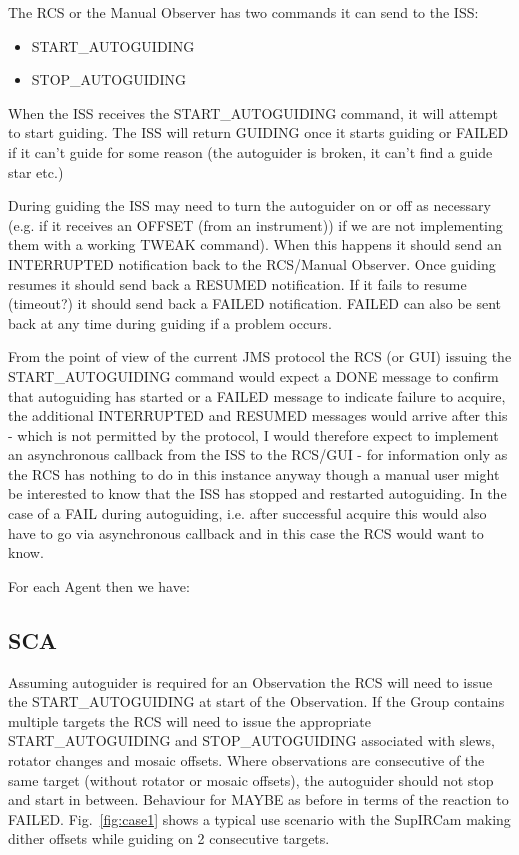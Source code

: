 \documentclass{article}
\begin{document}
The RCS or the Manual Observer has two commands
it can send to the ISS:

\begin{itemize}
\item START\_AUTOGUIDING
\item STOP\_AUTOGUIDING
\end{itemize}

When the ISS receives the START\_AUTOGUIDING command,
it will attempt to start guiding.  The ISS will
return GUIDING once it starts guiding or
FAILED if it can't guide for some reason (the
autoguider is broken, it can't find a guide star
etc.)  

During guiding the ISS may need to turn the autoguider on or
off as necessary (e.g. if it receives an OFFSET (from an instrument)) 
if we are not implementing them with a working TWEAK command).  
When this happens it should send an INTERRUPTED notification back to the
RCS/Manual Observer.  Once guiding resumes it should
send back a RESUMED notification.  If it fails to resume (timeout?)
it should send back a FAILED notification.  FAILED can also be
sent back at any time during guiding if a problem occurs.
 
From the point of view of the current JMS protocol the RCS (or GUI) issuing the
START\_AUTOGUIDING command would expect a DONE message to confirm that autoguiding has started
or a FAILED message to indicate failure to acquire, the additional INTERRUPTED and RESUMED
messages would arrive after this - which is not permitted by the protocol, I would therefore
expect to implement an asynchronous callback from the ISS to the RCS/GUI - for information only
as the RCS has nothing to do in this instance anyway though a manual user might be interested
to know that the ISS has stopped and restarted autoguiding. In the case of a FAIL during autoguiding,
i.e. after successful acquire this would also have to go via asynchronous callback and in this case the
RCS would want to know.


For each Agent then we have:

\subsection{SCA}

Assuming autoguider is required for an {\rm Observation} the RCS will need to issue the START\_AUTOGUIDING at start of the {\rm Observation}.  If the {\rm Group} contains multiple targets the RCS will need to issue the appropriate START\_AUTOGUIDING and STOP\_AUTOGUIDING associated with slews, rotator changes and mosaic offsets.  
Where observations are consecutive of the same target (without rotator or mosaic offsets), the autoguider should not stop and start in between.  Behaviour for MAYBE as before in terms of the reaction to FAILED. Fig.~\ref{fig:case1} shows a typical use scenario with the SupIRCam making dither offsets while guiding on 2 consecutive targets.
\end{document}
